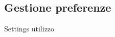 \documentclass[../Funzionalita.tex]{subfiles}
\begin{document}
\subsection{Gestione preferenze}

				
		Settings
		utilizzo
\end{document}
